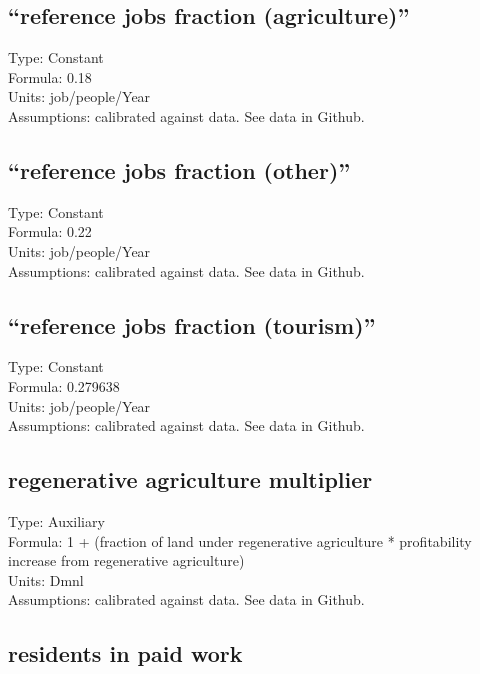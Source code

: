\documentclass[
  11pt,
]{book}
\begin{document}
\hypertarget{reference-jobs-fraction-agriculture}{%
\subsection{``reference jobs fraction (agriculture)''}\label{reference-jobs-fraction-agriculture}}

Type: Constant\\
Formula: 0.18\\
Units: job/people/Year\\
Assumptions: calibrated against data. See data in Github.

\hypertarget{reference-jobs-fraction-other}{%
\subsection{``reference jobs fraction (other)''}\label{reference-jobs-fraction-other}}

Type: Constant\\
Formula: 0.22\\
Units: job/people/Year\\
Assumptions: calibrated against data. See data in Github.

\hypertarget{reference-jobs-fraction-tourism}{%
\subsection{``reference jobs fraction (tourism)''}\label{reference-jobs-fraction-tourism}}

Type: Constant\\
Formula: 0.279638\\
Units: job/people/Year\\
Assumptions: calibrated against data. See data in Github.

\hypertarget{regenerative-agriculture-multiplier}{%
\subsection{regenerative agriculture multiplier}\label{regenerative-agriculture-multiplier}}

Type: Auxiliary\\
Formula: 1 + (fraction of land under regenerative agriculture * profitability increase from regenerative agriculture)\\
Units: Dmnl\\
Assumptions: calibrated against data. See data in Github.

\hypertarget{residents-in-paid-work}{%
\subsection{residents in paid work}\label{residents-in-paid-work}}
\end{document}
